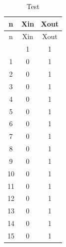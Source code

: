 \documentclass[a4paper, titlepage]{article}
\begin{document}
\begin{longtable}{*3c}
\caption{Test}
\label{}\\
\toprule
n & Xin & Xout\\
\midrule
\endfirsthead
n & Xin & Xout\\
\midrule
\endhead
\midrule
\endfoot
\bottomrule
\endlastfoot
0 & 1& 1\\
1 & 0& 1\\
2 & 0& 1\\
3 & 0& 1\\
4 & 0& 1\\
5 & 0& 1\\
6 & 0& 1\\
7 & 0& 1 \\
8 & 0& 1 \\
9 & 0& 1\\
10& 0& 1\\
11& 0& 1\\
12& 0& 1\\
13& 0& 1\\
14& 0& 1\\
15 &0& 1\\ 
\end{longtable}
\newpage
\end{document}
